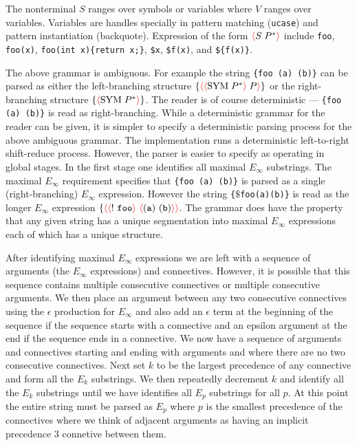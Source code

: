 \documentclass{article}
\newcommand{\fopen}{{\color{red} \langle}}
\newcommand{\fclose}{{\color{red} \rangle}}
\begin{document}
The nonterminal $S$ ranges over symbols or variables where $V$ ranges over variables.  Variables are handles specially in pattern matching ({\tt ucase}) and pattern instantiation (backquote).
Expression of the form $\fopen S\;P^*\fclose$ include {\tt foo}, {\tt foo(x)}, {\tt foo(int x)\{return x;\}},
{\tt \$x}, {\tt \$f(x)}, and {\tt \$\{f(x)\}}.


The above grammar is ambiguous.  For example the string {\tt \{foo (a) (b)\}} can be parsed as either the left-branching structure $\{\fopen\fopen\sym\;P^*\fclose\;P\fclose\}$
or the  right-branching structure $\{\fopen\sym\;P^*\fclose\}$.
The reader is of course deterministic --- {\tt \{foo (a) (b)\}} is read as right-branching.  While a deterministic grammar for the reader can be given, it is simpler
to specify a deterministic parsing process for the above ambiguous grammar.
The implementation runs a deterministic left-to-right shift-reduce process.
However, the parser is easier to specify as operating in global stages.  In the first stage one identifies all maximal $E_\infty$ substrings.
The maximal $E_\infty$ requirement specifies that {\tt \{foo (a) (b)\}} is parsed as a single (right-branching)
$E_\infty$ expression. However the string {\tt \{$\$$\;foo\;(a)\;(b)\}} is read as the longer $E_\infty$ expression $\{\fopen \fopen \mathtt{!~foo}\fclose\ \fopen \mathtt{(a)~(b)} \fclose \fclose$.
The grammar does have the property that any given string has a unique segmentation into maximal $E_\infty$ expressions each of which has a unique structure.

After identifying maximal $E_\infty$ expressions we are left with a sequence of arguments (the $E_\infty$ expressions) and connectives.
However, it is possible that this sequence contains multiple consecutive connectives or multiple consecutive arguments.  We then place an argument between any two consecutive
connectives using the $\epsilon$ production for $E_\infty$ and also add an $\epsilon$ term at the beginning of the sequence if the sequence starts with a connective and an
epsilon argument at the end if the sequence ends in a connective.  We now have a sequence of arguments and connectives starting and ending with arguments and where there
are no two consecutive connectives.  Next set $k$ to be the largest precedence of any connective and form all the $E_k$ substrings. We then repeatedly decrement $k$ and identify all the $E_k$ substrings
until we have identifies all $E_p$ substrings for all $p$.  At this point the entire string must be parsed as $E_p$ where $p$ is the smallest precedence of the connectives
where we think of adjacent arguments as having an implicit precedence 3 connetive between them.
\end{document}
